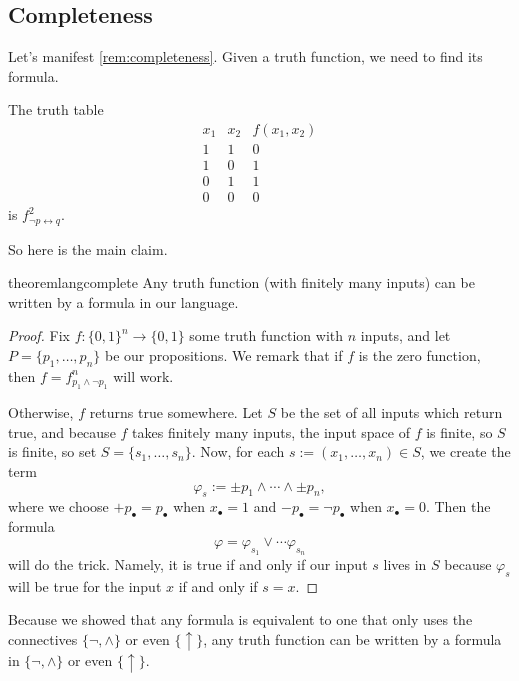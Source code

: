 \subsection{Completeness}
Let's manifest \autoref{rem:completeness}. Given a truth function, we need to find its formula.
\begin{example}
	The truth table
	\[\begin{array}{c|c||c}
		x_1 & x_2 & f(x_1,x_2) \\
		\hline
		1 & 1 & 0 \\
		1 & 0 & 1 \\
		0 & 1 & 1 \\
		0 & 0 & 0
	\end{array}\]
	is $f_{\lnot p\leftrightarrow q}^2$.
\end{example}
So here is the main claim.
\begin{restatable}{theorem}{langcomplete} \label{thm:langcomplete}
	Any truth function (with finitely many inputs) can be written by a formula in our language.
\end{restatable}
\begin{proof}
	Fix $f:\{0,1\}^n\to\{0,1\}$ some truth function with $n$ inputs, and let $P=\{p_1,\ldots,p_n\}$ be our propositions. We remark that if $f$ is the zero function, then $f=f_{p_1\land\lnot p_1}^n$ will work.

	Otherwise, $f$ returns true somewhere. Let $S$ be the set of all inputs which return true, and because $f$ takes finitely many inputs, the input space of $f$ is finite, so $S$ is finite, so set $S=\{s_1,\ldots,s_n\}$. Now, for each $s:=(x_1,\ldots,x_n)\in S$, we create the term
	\[\varphi_s:=\pm p_1\land\cdots\land\pm p_n,\]
	where we choose $+p_\bullet=p_\bullet$ when $x_\bullet=1$ and $-p_\bullet=\lnot p_\bullet$ when $x_\bullet=0$. Then the formula
	\[\varphi=\varphi_{s_1}\lor\cdots\varphi_{s_n}\]
	will do the trick. Namely, it is true if and only if our input $s$ lives in $S$ because $\varphi_s$ will be true for the input $x$ if and only if $s=x$.
\end{proof}
\begin{remark}
	Because we showed that any formula is equivalent to one that only uses the connectives $\{\lnot,\land\}$ or even $\{\uparrow\}$, any truth function can be written by a formula in $\{\lnot,\land\}$ or even $\{\uparrow\}$.
\end{remark}